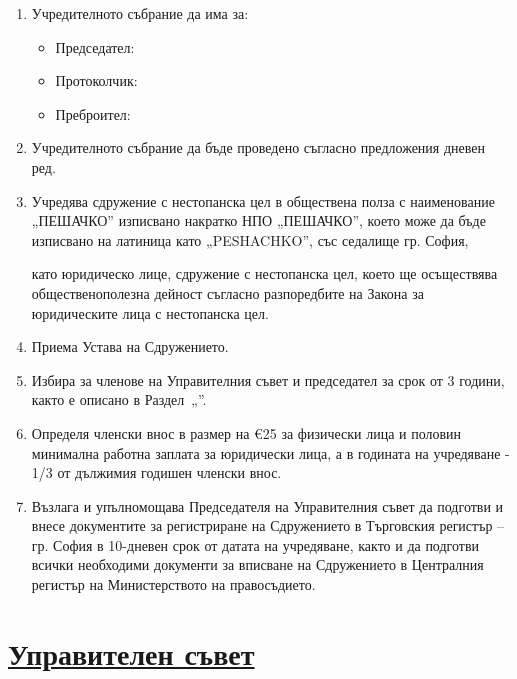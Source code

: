 \documentclass[11pt,a4paper]{article}
\newlength{\itemvspace}
\begin{document}
\begin{enumerate}
\item Учредителното събрание да има за: \\[0.1cm]
  \begin{itemize}
  \item Председател: \dotfill \\[\itemvspace]
  \item Протоколчик: \dotfill \\[\itemvspace]
  \item Преброител: \dotfill
  \end{itemize}
\item Учредителното събрание да бъде проведено съгласно предложения дневен ред.
\item Учредява сдружение с нестопанска цел в обществена полза с наименование „ПЕШАЧКО”
  изписвано накратко НПО „ПЕШАЧКО”, което може да бъде изписвано на латиница като
  „PESHACHKO”, със седалище гр. София, \\[0.1cm]

  \dotfill

  като юридическо лице, сдружение с нестопанска цел, което ще осъществява
  общественополезна дейност съгласно разпоредбите на Закона за юридическите лица с
  нестопанска цел.
\item Приема Устава на Сдружението.
\item Избира за членове на Управителния съвет и председател за срок от 3 години, както
  е описано в Раздел~„”.
\item Определя членски внос в размер на €25 за физически лица и половин минимална
  работна заплата за юридически лица, а в годината на учредяване - 1/3 от дължимия
  годишен членски внос.
\item Възлага и упълномощава Председателя на Управителния съвет да подготви и внесе
  документите за регистриране на Сдружението в Търговския регистър – гр. София в
  10-дневен срок от датата на учредяване, както и да подготви всички необходими
  документи за вписване на Сдружението в Централния регистър на Министерството на
  правосъдието.
\end{enumerate}

\vspace{1cm}

\section*{\uline{Управителен съвет}}\label{sec:management-board}
\end{document}
